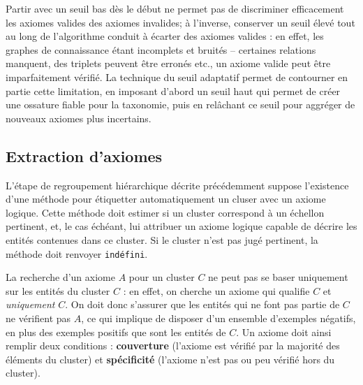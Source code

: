 Partir avec un seuil bas dès le début ne permet pas de discriminer efficacement les axiomes valides des axiomes invalides; à l'inverse, conserver un seuil élevé tout au long de l'algorithme conduit à écarter des axiomes valides : en effet, les graphes de connaissance étant incomplets et bruités – certaines relations manquent, des triplets peuvent être erronés etc., un axiome valide peut être imparfaitement vérifié. La technique du seuil adaptatif permet de contourner en partie cette limitation, en imposant d'abord un seuil haut qui permet de créer une ossature fiable pour la taxonomie, puis en relâchant ce seuil pour aggréger de nouveaux axiomes plus incertains.



% 
% 
% 
% 


\subsection{Extraction d'axiomes}
\label{subsec:texp-exaxiom}

L'étape de regroupement hiérarchique décrite précédemment suppose l'existence d'une méthode pour étiquetter automatiquement un cluser avec un axiome logique. Cette méthode doit estimer si un cluster correspond à un échellon pertinent, et, le cas échéant, lui attribuer un axiome logique capable de décrire les entités contenues dans ce cluster. Si le cluster n'est pas jugé pertinent, la méthode doit renvoyer \texttt{indéfini}.

La recherche d'un axiome $A$ pour un cluster $C$ ne peut pas se baser uniquement sur les entités du cluster $C$ : en effet, on cherche un axiome qui qualifie $C$ et \textit{uniquement} $C$. On doit donc s'assurer que les entités qui ne font pas partie de $C$ ne vérifient pas $A$, ce qui implique de disposer d'un ensemble d'exemples négatifs, en plus des exemples positifs que sont les entités de $C$. Un axiome doit ainsi remplir deux conditions : \textbf{couverture} (l'axiome est vérifié par la majorité des éléments du cluster) et \textbf{spécificité} (l'axiome n'est pas ou peu vérifié hors du cluster). 

